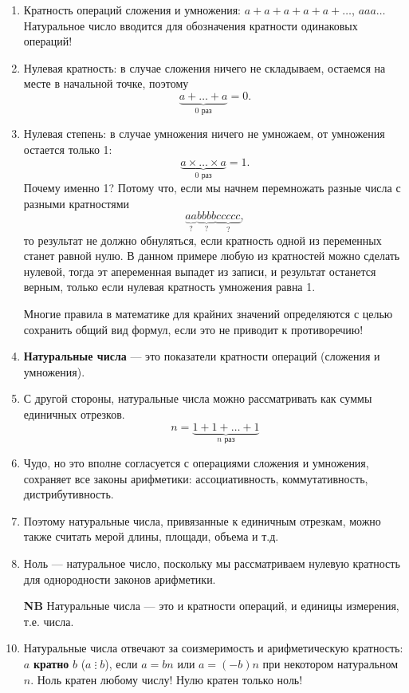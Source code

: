 
\begin{enumerate}
\item Кратность операций сложения и умножения: $a+a+a+a+a+\dots$, $a a a\ldots$ Натуральное число вводится для обозначения кратности одинаковых операций!
\item Нулевая кратность: в случае сложения ничего не складываем, остаемся на месте в начальной точке, поэтому
$$
\underbrace{a+\dots+a}_{0\mbox{ раз}}=0.
$$
\item Нулевая степень: в случае умножения ничего не умножаем, от умножения остается только 1:
$$
\underbrace{a\times\dots\times a}_{0\mbox{ раз}}=1.
$$
Почему именно 1? Потому что, если мы начнем перемножать разные числа с разными кратностями
$$
\underbrace{aa}_{?}\underbrace{bbbb}_{?}\underbrace{ccccc}_{?},
$$
то результат не должно обнуляться, если кратность одной из переменных станет равной нулю. В данном примере любую из кратностей можно сделать нулевой, тогда эт апеременная выпадет из записи, и результат останется верным, только если нулевая кратность умножения равна 1.

Многие правила в математике для крайних значений определяются с целью сохранить общий вид формул, если это не приводит к противоречию!
\item \textbf{Натуральные числа} --- это показатели кратности операций (сложения и умножения).
\item С другой стороны, натуральные числа можно рассматривать как суммы единичных отрезков.
$$
n=\underbrace{1+1+\dots+1}_{n\mbox{ раз}}
$$
\item Чудо, но это вполне согласуется с операциями сложения и умножения, сохраняет все законы арифметики: ассоциативность, коммутативность, дистрибутивность.
\item Поэтому натуральные числа, привязанные к единичным отрезкам, можно также считать мерой длины, площади, объема и т.д.
\item Ноль --- натуральное число, поскольку мы рассматриваем нулевую кратность для однородности законов арифметики.
\item[\bf NB] Натуральные числа --- это и кратности операций, и единицы измерения, т.е. числа.
\item Натуральные числа отвечают за соизмеримость и арифметическую кратность: $a$ \textbf{кратно} $b$ ($a\mathop{\vdots} b$), если $a=bn$ или $a=(-b)n$ при некотором натуральном $n$. Ноль кратен любому числу! Нулю кратен только ноль!


\end{enumerate}
